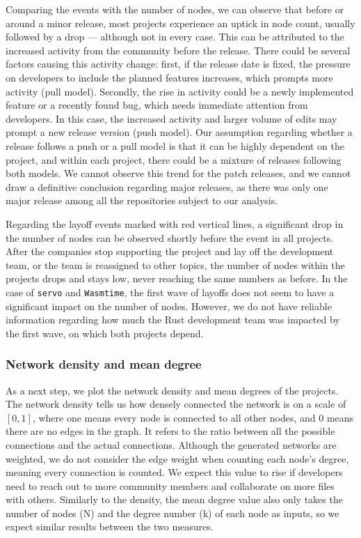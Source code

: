 Comparing the events with the number of nodes, we can observe that before or around a minor release, most projects experience an uptick in node count, usually followed by a drop — although not in every case. This can be attributed to the increased activity from the community before the release. There could be several factors causing this activity change: first, if the release date is fixed, the pressure on developers to include the planned features increases, which prompts more activity (pull model). Secondly, the rise in activity could be a newly implemented feature or a recently found bug, which needs immediate attention from developers. In this case, the increased activity and larger volume of edits may prompt a new release version (push model). Our assumption regarding whether a release follows a push or a pull model is that it can be highly dependent on the project, and within each project, there could be a mixture of releases following both models. We cannot observe this trend for the patch releases, and we cannot draw a definitive conclusion regarding major releases, as there was only one major release among all the repositories subject to our analysis.

Regarding the layoff events marked with red vertical lines, a significant drop in the number of nodes can be observed shortly before the event in all projects. After the companies stop supporting the project and lay off the development team, or the team is reassigned to other topics, the number of nodes within the projects drops and stays low, never reaching the same numbers as before. In the case of \texttt{servo} and \texttt{Wasmtime}, the first wave of layoffs does not seem to have a significant impact on the number of nodes. However, we do not have reliable information regarding how much the Rust development team was impacted by the first wave, on which both projects depend.

\subsubsection{Network density and mean degree}
\label{sec:density_degree}
As a next step, we plot the network density and mean degrees of the projects. The network density tells us how densely connected the network is on a scale of $[0,1]$, where one means every node is connected to all other nodes, and 0 means there are no edges in the graph. It refers to the ratio between all the possible connections and the actual connections. Although the generated networks are weighted, we do not consider the edge weight when counting each node's degree, meaning every connection is counted. We expect this value to rise if developers need to reach out to more community members and collaborate on more files with others. Similarly to the density, the mean degree value also only takes the number of nodes (N) and the degree number (k) of each node as inputs, so we expect similar results between the two measures.

